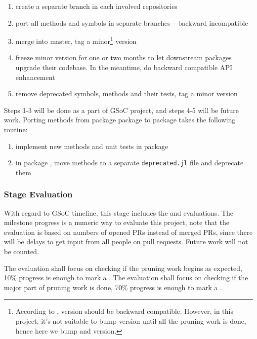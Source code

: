 \newcommand{\packageA}{package \sname{A}\xspace}
\newcommand{\packageB}{package \sname{B}\xspace}
\begin{enumerate}
    \item create a separate branch in each involved repositories
    \item port all methods and symbols in separate branches -- backward incompatible
    \item merge into master, tag a minor\footnote{According to \semanticversion{},  version should be backward compatible. However, in this project, it's not suitable to bump  version until all the pruning work is done, hence here we bump  and  version.} version
    \item freeze minor version for one or two months to let downstream packages upgrade their codebase. In the meantime, do backward compatible API enhancement
    \item remove deprecated symbols, methods and their tests, tag a minor version
\end{enumerate}
Steps 1-3 will be done as a part of GSoC project, and steps 4-5 will be future work. Porting methods from package \packageA to \packageB takes the following routine:
\begin{enumerate}
    \item implement new methods and unit tests in \packageB
    \item in \packageA, move methods to a separate \texttt{deprecated.jl} file and deprecate them
\end{enumerate}

\subsubsection*{Stage Evaluation}

With regard to GSoC timeline, this stage includes the  and  evaluations. The milestone progress is a numeric way to evaluate this project, note that the evaluation is based on numbers of opened PRs instead of merged PRs, since there will be delays to get input from all people on pull requests. Future work will not be counted.\par

The  evaluation shall focus on checking if the pruning work begins as expected, 10\% progress is enough to mark a . The  evaluation shall focus on checking if the major part of pruning work is done, 70\% progress is enough to mark a .
